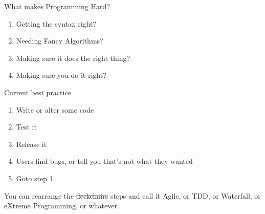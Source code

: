 \documentclass[xetex,aspectratio=169,14pt,hyperref={pdfpagelabels=true,pdflang={en-GB}}]{beamer}
\begin{document}
\begin{frame}
  {What makes Programming Hard?}

  \begin{enumerate}
  \item Getting the syntax right? \\

    \bigskip
  \item Needing Fancy Algorithms? \\

    \bigskip
  \item Making sure it does the right thing? \\

    \bigskip
  \item Making sure you do it right? \\
  \end{enumerate}
\end{frame}

\begin{frame}
  {Current best practice}


  \bigskip

  \begin{enumerate}
  \item Write or alter some code
  \item Test it
  \item Release it
  \item Users find bugs, or tell you that's not what they wanted
  \item Goto step 1
  \end{enumerate}

  \bigskip

  You can rearrange the \sout{deckchairs} steps and call it Agile, or
  TDD, or Waterfall, or eXtreme Programming, or whatever.
\end{frame}
\end{document}

